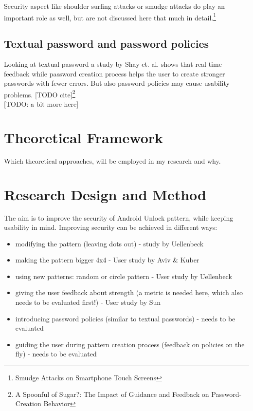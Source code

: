 \documentclass[twocolumn, a4paper, 10pt]{article}
\begin{document}
Security aspect like shoulder surfing attacks or smudge attacks do play an important role as well, but are not discussed here that much in detail.\footnote{Smudge Attacks on Smartphone Touch Screens}\\

\subsection{Textual password and password policies}
Looking at textual password a study by Shay et. al. shows that real-time feedback while password creation process helps the user to create stronger passwords with fewer errors. But also password policies may cause usability problems. [TODO cite]\footnote{A Spoonful of Sugar?: The Impact of Guidance and Feedback on Password-Creation Behavior}\\

[TODO: a bit more here]\\

\section{Theoretical Framework}
Which theoretical approaches, will be employed in my research and why.

\section{Research Design and Method}

The aim is to improve the security of Android Unlock pattern, while keeping usability in mind. Improving security can be achieved in different ways:\\

\begin{itemize}
  \item modifying the pattern (leaving dots out) - study by Uellenbeck
  \item making the pattern bigger 4x4 - User study by Aviv \& Kuber
  \item using new patterns: random or circle pattern - User study by Uellenbeck
  \item giving the user feedback about strength (a metric is needed here, which also needs to be evaluated first!) - User study by Sun
  \item introducing password policies (similar to textual passwords) - needs to be evaluated 
  \item guiding the user during pattern creation process (feedback on policies on the fly) - needs to be evaluated
\end{itemize}
\end{document}
